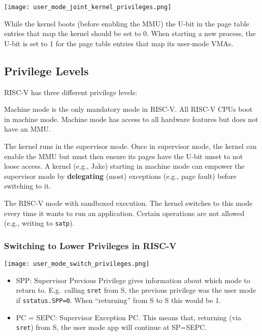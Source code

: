 \texttt{[image: user\_mode\_joint\_kernel\_privileges.png]}

While the kernel boots (before enabling the MMU) the U-bit in the page table entries that map the kernel should be set to 0. When starting a new process, the U-bit is set to 1 for the page table entries that map its user-mode VMAs.

\subsection{Privilege Levels}

RISC-V has three different privilege levels:

\newpar{}

Machine mode is the only mandatory mode in RISC-V. All RISC-V CPUs boot in machine mode. Machine mode has access to all hardware features but does not have an MMU.

\newpar{}

The kernel runs in the supervisor mode. Once in supervisor mode, the kernel can enable the MMU but must then ensure its pages have the U-bit unset to not loose access. A kernel (e.g., Jake) starting in machine mode can
empower the supervisor mode by \textbf{delegating} (most) exceptions (e.g., page fault) before switching to it.

\newpar{}

The RISC-V mode with sandboxed execution. The kernel switches to this mode every time it wants to run an application. Certain operations are not allowed (e.g., writing to \texttt{satp}).

\subsubsection{Switching to Lower Privileges in RISC-V}

\texttt{[image: user\_mode\_switch\_privileges.png]}

\newpar{}
\begin{itemize}
    \item SPP: Supervisor Previous Privilege gives information about which mode to return to. E.g.\ calling \texttt{sret} from S, the previous privilege was the user mode if \texttt{sstatus.SPP=0}. When ``returning'' from S to S this would be 1.
    \item PC = SEPC: Supervisor Exception PC. This means that, returning (via \texttt{sret}) from S, the user mode app will continue at SP=SEPC.
\end{itemize}


